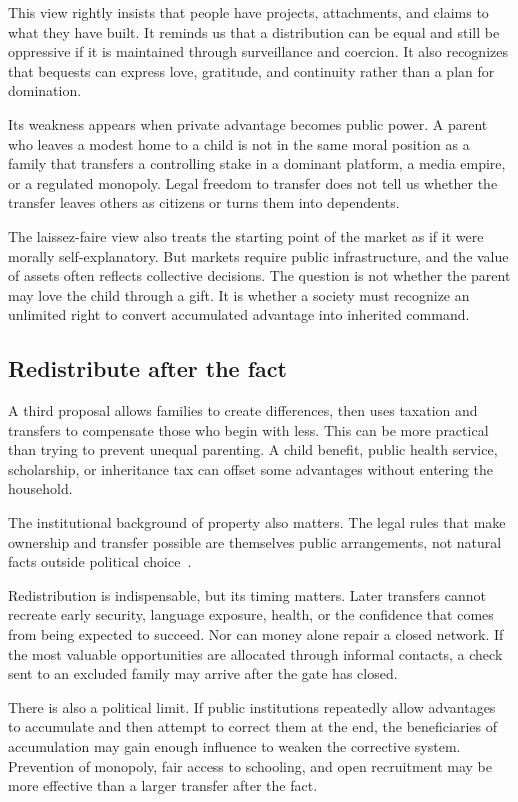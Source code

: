 ﻿\documentclass[12pt,a4paper]{book}
\begin{document}
This view rightly insists that people have projects, attachments, and claims
to what they have built.  It reminds us that a distribution can be equal and
still be oppressive if it is maintained through surveillance and coercion.
It also recognizes that bequests can express love, gratitude, and continuity
rather than a plan for domination.

Its weakness appears when private advantage becomes public power.  A parent
who leaves a modest home to a child is not in the same moral position as a
family that transfers a controlling stake in a dominant platform, a media
empire, or a regulated monopoly.  Legal freedom to transfer does not tell
us whether the transfer leaves others as citizens or turns them into
dependents.

The laissez-faire view also treats the starting point of the market as if it
were morally self-explanatory.  But markets require public infrastructure,
and the value of assets often reflects collective decisions.  The question
is not whether the parent may love the child through a gift.  It is whether a
society must recognize an unlimited right to convert accumulated advantage
into inherited command.

\subsection{Redistribute after the fact}

A third proposal allows families to create differences, then uses taxation
and transfers to compensate those who begin with less.  This can be more
practical than trying to prevent unequal parenting.  A child benefit, public
health service, scholarship, or inheritance tax can offset some advantages
without entering the household.

The institutional background of property also matters.  The legal rules that
make ownership and transfer possible are themselves public arrangements, not
natural facts outside political choice~\cite{MurphyNagel2002}.

Redistribution is indispensable, but its timing matters.  Later transfers
cannot recreate early security, language exposure, health, or the confidence
that comes from being expected to succeed.  Nor can money alone repair a
closed network.  If the most valuable opportunities are allocated through
informal contacts, a check sent to an excluded family may arrive after the
gate has closed.

There is also a political limit.  If public institutions repeatedly allow
advantages to accumulate and then attempt to correct them at the end, the
beneficiaries of accumulation may gain enough influence to weaken the
corrective system.  Prevention of monopoly, fair access to schooling, and
open recruitment may be more effective than a larger transfer after the
fact.
\end{document}
